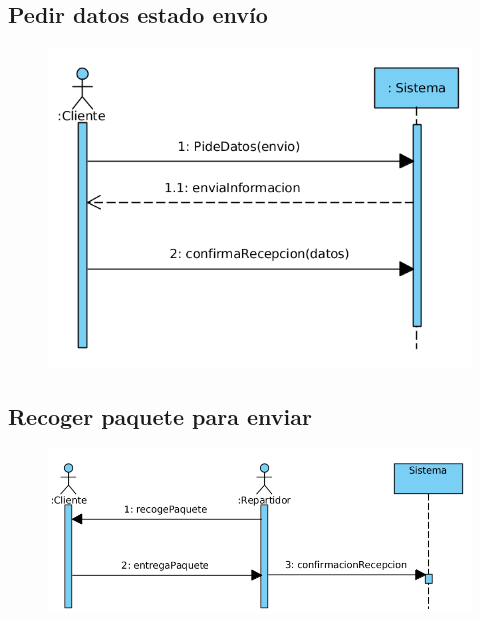 \subsection{Pedir datos estado envío}
\begin{figure}[H]
	\centering
	\includegraphics[width=16cm]{45}
\end{figure}
\subsection{Recoger paquete para enviar}
\begin{figure}[H]
	\centering
	\includegraphics[width=16cm]{46}
\end{figure}
